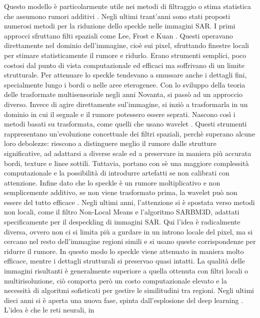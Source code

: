 Questo modello è particolarmente utile nei metodi di filtraggio o stima statistica 
che assumono rumori additivi \cite{tutorSpeckle}. 
Negli ultimi trant'anni sono stati proposti numerosi metodi per la riduzione dello speckle nelle immagini SAR.
 I primi approcci sfruttano filti spaziali come Lee, Frost e Kuan \cite{r2024specklenoiseanalysissynthetic}.
Questi operavano direttamente nel dominio dell'immagine, cioè sui pixel, sfruttando finestre locali per stimare
 statisticamente il rumore e ridurlo. Erano strumenti semplici, poco costosi dal punto 
di vista computazionale ed efficaci ma soffrivano di un limite strutturale. Per attenuare lo speckle tendevano a 
smussare anche i dettagli fini, specialmente lungo i bordi o nelle aree eterogenee. 
Con lo sviluppo della teoria delle trasformate multisensoriale negli anni Novanta, si passò ad un approccio diverso. 
Invece di agire direttamente sul'immagine, si inziò a trasformarla in un dominio 
in cui il segnale e il rumore potessero essere seprati. Nascono così i metodi basati su trasformata, come quelli che 
usano wavelet \cite{Argenti2003}. Questi strumenti rappresentano un'evoluzione concettuale dei filtri spaziali,
perchè superano alcune loro debolezze: riescono a distinguere meglio il rumore dalle strutture significative, ad 
adattarsi a diverse scale ed a preservare in maniera più accurata bordi, texture e linee sottili. 
Tuttavia, portano con sè una maggiore complessità computazionale e la possibilità di introdurre artefatti se non 
calibrati con attenzione. Infine dato che lo speckle è un rumore moltiplicativo e non semplicemente 
additivo, se non viene trasformato prima, la wavelet può non essere del tutto efficace \cite{tutorSpeckle}.
Negli ultimi anni, l’attenzione si è spostata verso metodi non locali, come il filtro Non-Local Means e l’algoritmo 
SARBM3D, adattati specificamente per il despeckling di immagini SAR. Qui l'idea è radicalmente diversa, ovvero non ci si limita più a gurdare in un 
introno locale del pixel, ma si cercano nel resto dell'immagine regioni simili e si usano queste 
corrispondenze per ridurre il rumore. In questo modo lo speckle viene attenuato in maniera molto efficace, mentre 
i dettagli strutturali si preservao quasi intatti. La qualità delle immagini risultanti è generalmente
superiore a quella ottenuta con filtri locali o multirisoluzione, ciò comporta però un costo computazionale elevato 
e la necessità di algoritmi sofisticati per gestire le similitudini tra regioni. Negli ultimi dieci 
anni si è aperta una nuova fase, spinta dall'esplosione del deep learning \cite{DL_SAR}. L'idea è che le reti neurali, in 
